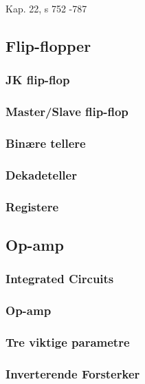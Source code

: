 Kap. 22, s 752 -787

\subsection{Flip-flopper}
  
  \subsubsection{JK flip-flop}
    
  \subsubsection{Master/Slave flip-flop}
    
  \subsubsection{Binære tellere}
    
  \subsubsection{Dekadeteller}
    
  \subsubsection{Registere}
    

\subsection{Op-amp}
  \subsubsection{Integrated Circuits}
    
  \subsubsection{Op-amp}
    
  \subsubsection{Tre viktige parametre}
    
  \subsubsection{Inverterende Forsterker}
    
